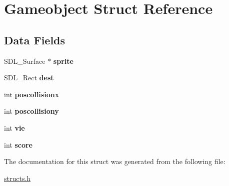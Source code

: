 \hypertarget{structGameobject}{}\section{Gameobject Struct Reference}
\label{structGameobject}
\subsection*{Data Fields}
\begin{DoxyCompactItemize}
\item 
\mbox{\label{structGameobject_ab5ac82fa7c7eba5a77b41e9caa29b2f9}} 
S\+D\+L\+\_\+\+Surface $\ast$ {\bfseries sprite}
\item 
\mbox{\label{structGameobject_a46cfdc88206b304c8e572053ff53efba}} 
S\+D\+L\+\_\+\+Rect {\bfseries dest}
\item 
\mbox{\label{structGameobject_ac208f8607a424c1b7376123a31da6d1f}} 
int {\bfseries poscollisionx}
\item 
\mbox{\label{structGameobject_a3faf0e674bd2a6d60549dfdfb52ea845}} 
int {\bfseries poscollisiony}
\item 
\mbox{\label{structGameobject_a55e82811cda7a8874f7b578c49091cac}} 
int {\bfseries vie}
\item 
\mbox{\label{structGameobject_ad0667660ca3b3055826bae004730f1a1}} 
int {\bfseries score}
\end{DoxyCompactItemize}


The documentation for this struct was generated from the following file\+:\begin{DoxyCompactItemize}
\item 
\hyperlink{structs_8h}{structs.\+h}\end{DoxyCompactItemize}
